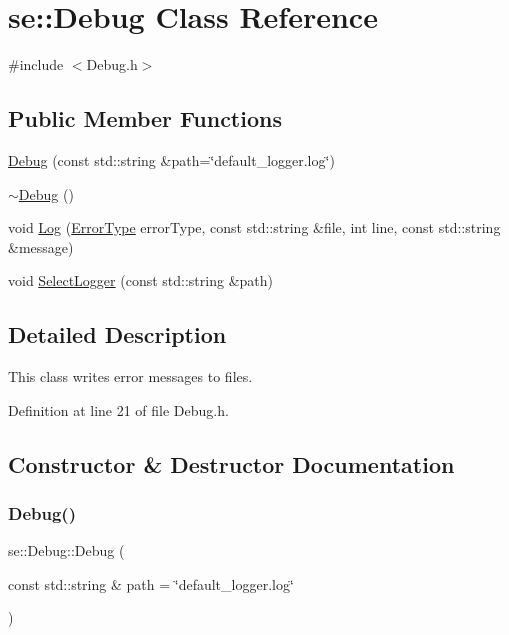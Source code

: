 \hypertarget{classse_1_1_debug}{}\section{se\+:\+:Debug Class Reference}
\label{classse_1_1_debug}


{\ttfamily \#include $<$Debug.\+h$>$}

\subsection*{Public Member Functions}
\begin{DoxyCompactItemize}
\item 
\mbox{\hyperlink{classse_1_1_debug_a1292de4f720caa545023e0b4a4735eef}{Debug}} (const std\+::string \&path=\char`\"{}default\+\_\+logger.\+log\char`\"{})
\item 
\mbox{\hyperlink{classse_1_1_debug_a2ff6371c83b2a8918b15907bd1491ac9}{$\sim$\+Debug}} ()
\item 
void \mbox{\hyperlink{classse_1_1_debug_a3ebaea1144b70d56762d2b1054c8251d}{Log}} (\mbox{\hyperlink{namespacese_aaa5cbe4d4821d8a349338e23de6ef9c4}{Error\+Type}} error\+Type, const std\+::string \&file, int line, const std\+::string \&message)
\item 
void \mbox{\hyperlink{classse_1_1_debug_ab97d44dca8606c2be2cb709f7e82be09}{Select\+Logger}} (const std\+::string \&path)
\end{DoxyCompactItemize}


\subsection{Detailed Description}
This class writes error messages to files. 

Definition at line 21 of file Debug.\+h.



\subsection{Constructor \& Destructor Documentation}
\mbox{\label{classse_1_1_debug_a1292de4f720caa545023e0b4a4735eef}} 
\subsubsection{\texorpdfstring{Debug()}{Debug()}}
{\footnotesize\ttfamily se\+::\+Debug\+::\+Debug (\begin{DoxyParamCaption}\item[{const std\+::string \&}]{path = {\ttfamily \char`\"{}default\+\_\+logger.log\char`\"{}} }\end{DoxyParamCaption})}


